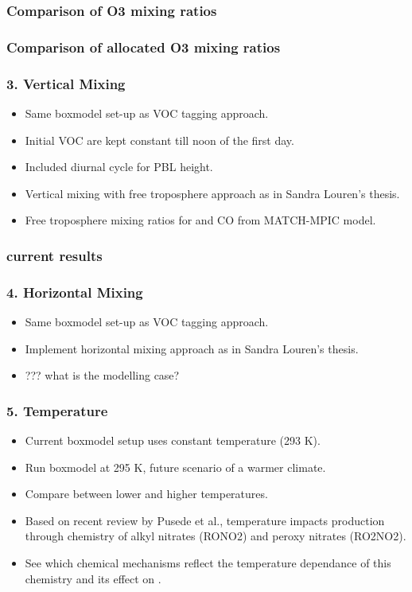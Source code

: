 \begin{frame}
    \frametitle{Comparison of O3 mixing ratios}
\end{frame}

\begin{frame}
    \frametitle{Comparison of allocated O3 mixing ratios}
\end{frame}

\begin{frame}
    \frametitle{3. Vertical Mixing}

    \begin{itemize}
        \item Same boxmodel set-up as VOC tagging approach.
        \item Initial VOC are kept constant till noon of the first day.
        \item Included diurnal cycle for PBL height.
        \item Vertical mixing with free troposphere approach as in Sandra Louren's thesis.
        \item Free troposphere mixing ratios for  and CO from MATCH-MPIC model.
    \end{itemize}
\end{frame}

\begin{frame}
    \frametitle{current results}
\end{frame}

\begin{frame}
    \frametitle{4. Horizontal Mixing}

    \begin{itemize}
        \item Same boxmodel set-up as VOC tagging approach.
        \item Implement horizontal mixing approach as in Sandra Louren's thesis.
        \item ??? what is the modelling case?
    \end{itemize}
\end{frame}

\begin{frame}
    \frametitle{5. Temperature}

    \begin{itemize}
        \item Current boxmodel setup uses constant temperature (293 K).
        \item Run boxmodel at 295 K, future scenario of a warmer climate.
        \item Compare  between lower and higher temperatures.
        \item Based on recent review by Pusede et al., temperature impacts  production through chemistry of alkyl nitrates (RONO2) and peroxy nitrates (RO2NO2).
        \item See which chemical mechanisms reflect the temperature dependance of this chemistry and its effect on .
    \end{itemize}
\end{frame}

